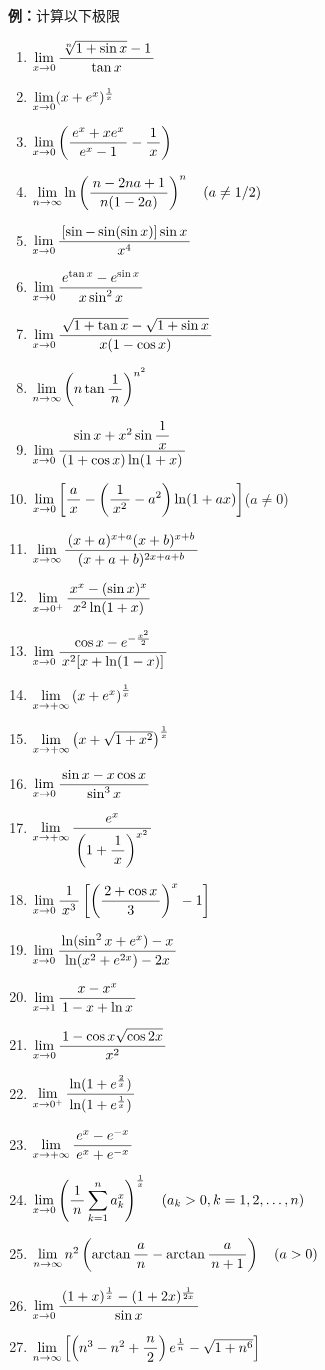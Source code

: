 {\bf 例：}计算以下极限
\begin{enumerate}[(1)]
  \setlength{\itemindent}{1cm}
  \item $\limx0\df{\sqrt[n]{1+\sin x}-1}{\tan x}$
  \item $\limx0(x+e^x)^{\frac1x}$
  \item $\limx0\left(\df{e^x+xe^x}{e^x-1}-\df1x\right)$
  \item $\limn\ln\left(\df{n-2na+1}{n(1-2a)}\right)^n\quad(a\ne1/2)$
  \item $\limx0\df{[\sin-\sin(\sin x)]\sin x}{x^4}$
  \item $\limx0\df{e^{\tan x}-e^{\sin x}}{x\sin^2x}$
  \item $\limx0\df{\sqrt{1+\tan x}-\sqrt{1+\sin x}}{x(1-\cos x)}$
  \item $\limn\left(n\tan\df1n\right)^{n^2}$
  \item $\limx0\df{\sin x+x^2\sin\df1x}{(1+\cos x)\ln(1+x)}$
  \item $\limx0\left[\df
  ax-\left(\df1{x^2}-a^2\right)\ln(1+ax)\right]$\quad($a\ne 0$)
  \item $\limx{\infty}\df{(x+a)^{x+a}(x+b)^{x+b}}{(x+a+b)^{2x+a+b}}$
  \item $\limx{0^+}\df{x^x-(\sin x)^x}{x^2\ln(1+x)}$
  \item $\limx0\df{\cos x-e^{-\frac{x^2}2}}{x^2[x+\ln(1-x)]}$
  \item $\limx{+\infty}\left(x+e^x\right)^{\frac1x}$
  \item $\limx{+\infty}\left(x+\sqrt{1+x^2}\right)^{\frac1x}$
  \item $\limx0\df{\sin x-x\cos x}{\sin^3x}$
  \item $\limx{+\infty}\df{e^x}{\left(1+\df1x\right)^{x^2}}$
  \item $\limx0\df1{x^3}\left[\left(\df{2+\cos x}3\right)^x-1\right]$
  \item $\limx0\df{\ln(\sin^2x+e^x)-x}{\ln(x^2+e^{2x})-2x}$
  \item $\limx1\df{x-x^x}{1-x+\ln x}$
  \item $\limx0\df{1-\cos x\sqrt{\cos2x}}{x^2}$
  \item $\limx{0^+}\df{\ln(1+e^{\frac2x})}{\ln(1+e^{\frac1x})}$
  \item $\limx{+\infty}\df{e^x-e^{-x}}{e^x+e^{-x}}$
  \item $\limx0\left(\df1n\sum\limits_{k=1}^na_k^x\right)^{\frac1x}
  \quad (a_k>0,k=1,2,\ldots,n)$
  \item $\limn n^2\left(\arctan\df an-\arctan\df a{n+1}\right)\quad (a>0)$
  \item $\limx0\df{(1+x)^{\frac1x}-(1+2x)^{\frac1{2x}}}{\sin x}$
  \item $\limn\left[\left(n^3-n^2+\df n2\right)e^{\frac1n}-\sqrt{1+n^6}\right]$
\end{enumerate}

